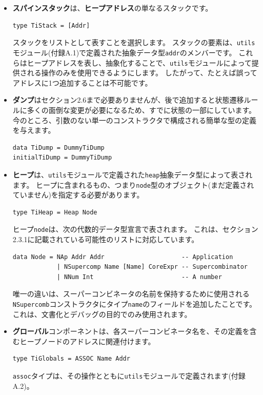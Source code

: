 \documentclass{jbook}
\begin{document}
\begin{itemize}
	\item \textbf{スパインスタック}は、\textbf{ヒープアドレス}の単なるスタックです。
	      \begin{verbatim}
type TiStack = [Addr]
\end{verbatim}
	      スタックをリストとして表すことを選択します。
	      スタックの要素は、\texttt{utils}モジュール(付録A.1)で定義された抽象データ型\texttt{addr}のメンバーです。
	      これらはヒープアドレスを表し、抽象化することで、\texttt{utils}モジュールによって提供される操作のみを使用できるようにします。
	      したがって、たとえば誤ってアドレスに1つ追加することは不可能です。
	\item \textbf{ダンプ}はセクション2.6まで必要ありませんが、後で追加すると状態遷移ルールに多くの面倒な変更が必要になるため、すでに状態の一部にしています。
	      今のところ、引数のない単一のコンストラクタで構成される簡単な型の定義を与えます。
	      \begin{verbatim}
data TiDump = DummyTiDump
initialTiDump = DummyTiDump
\end{verbatim}
	\item \textbf{ヒープ}は、\texttt{utils}モジュールで定義された\texttt{heap}抽象データ型によって表されます。
	      ヒープに含まれるもの、つまり\texttt{node}型のオブジェクト(まだ定義されていません)を指定する必要があります。
	      \begin{verbatim}
type TiHeap = Heap Node
\end{verbatim}
	      ヒープ\texttt{node}は、次の代数的データ型宣言で表されます。
	      これは、セクション2.3.1に記載されている可能性のリストに対応しています。
	      \begin{verbatim}
data Node = NAp Addr Addr                     -- Application
            | NSupercomp Name [Name] CoreExpr -- Supercombinator
            | NNum Int                        -- A number
\end{verbatim}
	      唯一の違いは、スーパーコンビネータの名前を保持するために使用される\texttt{NSupercomb}コンストラクタにタイプ\texttt{name}のフィールドを追加したことです。
	      これは、文書化とデバッグの目的でのみ使用されます。
	\item \textbf{グローバル}コンポーネントは、各スーパーコンビネータ名を、その定義を含むヒープノードのアドレスに関連付けます。
	      \begin{verbatim}
type TiGlobals = ASSOC Name Addr
\end{verbatim}
	      \texttt{assoc}タイプは、その操作とともに\texttt{utils}モジュールで定義されます(付録A.2)。

\end{itemize}
\end{document}
